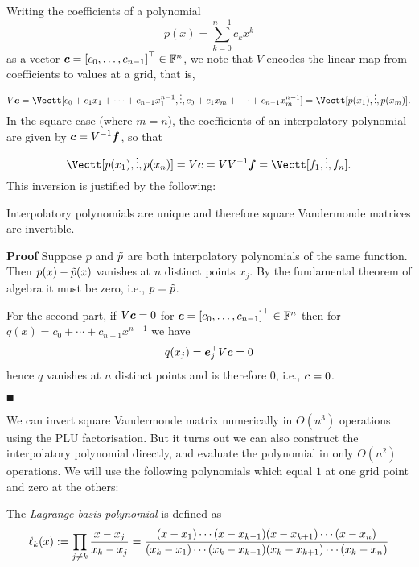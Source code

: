 Writing the coefficients of a polynomial
\[
p(x) = \ensuremath{\sum}_{k=0}^{n-1} c_k x^k
\]
as a vector  $\ensuremath{\bm{\c}} = \vectt[c_0,\ensuremath{\ldots},c_{n-1}] \ensuremath{\in} \ensuremath{\bbF}^n$, we note that $V$ encodes the linear map from coefficients to values at a grid, that is,
\[
V\ensuremath{\bm{\c}} = \Vectt[c_0 + c_1 x_1 + \ensuremath{\cdots} + c_{n-1} x_1^{n-1}, \ensuremath{\vdots}, c_0 + c_1 x_m + \ensuremath{\cdots} + c_{n-1} x_m^{n-1}] = \Vectt[p(x_1),\ensuremath{\vdots},p(x_m)].
\]
In the square case (where $m=n$), the coefficients of an interpolatory polynomial are given by $\bm{{\mbox{\boldmath$c$\unboldmath}}} = V^{-1} \bm{{\mbox{\boldmath$f$\unboldmath}}}$, so that
\[
\Vectt[p(x_1),\ensuremath{\vdots},p(x_n)] = V \ensuremath{\bm{\c}} = V V^{-1} \ensuremath{\bm{\f}} = \Vectt[f_1,\ensuremath{\vdots},f_n].
\]
This inversion is justified by the following:

\begin{proposition} Interpolatory polynomials are unique and therefore square Vandermonde matrices are invertible.

\end{proposition}
\textbf{Proof} Suppose $p$ and ${\tilde p}$ are both interpolatory polynomials of the same function. Then $p(x) - {\tilde p}(x)$ vanishes at $n$ distinct points $x_j$. By the fundamental theorem of algebra it must be zero, i.e., $p = {\tilde p}$.

For the second part, if $V \bm{{\mbox{\boldmath$c$\unboldmath}}} = 0$ for $\ensuremath{\bm{\c}} = \vectt[c_0,\ensuremath{\ldots},c_{n-1}] \ensuremath{\in} \ensuremath{\bbF}^n$ then for $q(x) = c_0 + \ensuremath{\cdots} + c_{n-1} x^{n-1}$ we have
\[
q(x_j) = \bm{{\mbox{\boldmath$e$\unboldmath}}}_j^\top V \bm{{\mbox{\boldmath$c$\unboldmath}}} = 0
\]
hence $q$ vanishes at $n$ distinct points and is therefore 0, i.e., $\bm{{\mbox{\boldmath$c$\unboldmath}}} = 0$.

\ensuremath{\QED}

We can invert square Vandermonde matrix numerically in $O(n^3)$ operations using the PLU factorisation. But it turns out we can also construct the interpolatory polynomial directly, and evaluate the polynomial in only $O(n^2)$ operations. We will use the following polynomials which equal $1$ at one grid point and zero at the others:

\begin{definition} The \emph{Lagrange basis polynomial} is defined as
\[
\ensuremath{\ell}_k(x) := \ensuremath{\prod}_{j \ensuremath{\neq} k} {x-x_j \over x_k - x_j} =  {(x-x_1) \ensuremath{\cdots}(x-x_{k-1})(x-x_{k+1}) \ensuremath{\cdots} (x-x_n) \over (x_k - x_1) \ensuremath{\cdots} (x_k - x_{k-1}) (x_k - x_{k+1}) \ensuremath{\cdots} (x_k - x_n)}
\]
\end{definition}

